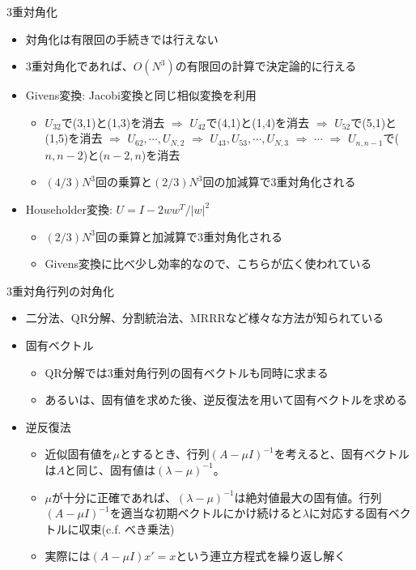 \begin{frame}[t,fragile]{3重対角化}
  \begin{itemize}
  \item 対角化は有限回の手続きでは行えない
  \item 3重対角化であれば、$O(N^3)$の有限回の計算で決定論的に行える
  \item Givens変換: Jacobi変換と同じ相似変換を利用
    \begin{itemize}
    \item $U_{32}$で(3,1)と(1,3)を消去 $\Rightarrow$ $U_{42}$で(4,1)と(1,4)を消去 $\Rightarrow$ $U_{52}$で(5,1)と(1,5)を消去 $\Rightarrow$ $U_{62},\cdots,U_{N,2}$ $\Rightarrow$ $U_{43},U_{53},\cdots,U_{N,3}$ $\Rightarrow$ $\cdots$ $\Rightarrow$ $U_{n,n-1}$で($n,n-2$)と($n-2,n$)を消去
    \item $(4/3)N^3$回の乗算と$(2/3)N^3$回の加減算で3重対角化される
    \end{itemize}
  \item Householder変換: $U = I - 2 w w^T / |w|^2$
    \begin{itemize}
    \item $(2/3)N^3$回の乗算と加減算で3重対角化される
    \item Givens変換に比べ少し効率的なので、こちらが広く使われている
    \end{itemize}
  \end{itemize}
\end{frame}

\begin{frame}[t,fragile]{3重対角行列の対角化}
  \begin{itemize}
  \item 二分法、QR分解、分割統治法、MRRRなど様々な方法が知られている
  \item 固有ベクトル
    \begin{itemize}
    \item QR分解では3重対角行列の固有ベクトルも同時に求まる
    \item あるいは、固有値を求めた後、逆反復法を用いて固有ベクトルを求める
    \end{itemize}
  \item 逆反復法
    \begin{itemize}
    \item 近似固有値を$\mu$とするとき、行列$(A - \mu I)^{-1}$を考えると、固有ベクトルは$A$と同じ、固有値は$(\lambda-\mu)^{-1}$。
    \item $\mu$が十分に正確であれば、$(\lambda-\mu)^{-1}$は絶対値最大の固有値。行列$(A - \mu I)^{-1}$を適当な初期ベクトルにかけ続けると$\lambda$に対応する固有ベクトルに収束(c.f. べき乗法)
    \item 実際には$(A-\mu I) x' = x$という連立方程式を繰り返し解く
    \end{itemize}
  \end{itemize}
\end{frame}


